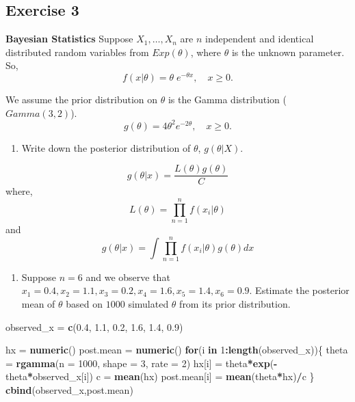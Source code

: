 \documentclass[
]{article}
\newenvironment{Shaded}{\begin{snugshade}}{\end{snugshade}}
\newcommand{\ControlFlowTok}[1]{\textcolor[rgb]{0.13,0.29,0.53}{\textbf{#1}}}
\newcommand{\DataTypeTok}[1]{\textcolor[rgb]{0.13,0.29,0.53}{#1}}
\newcommand{\DecValTok}[1]{\textcolor[rgb]{0.00,0.00,0.81}{#1}}
\newcommand{\FloatTok}[1]{\textcolor[rgb]{0.00,0.00,0.81}{#1}}
\newcommand{\KeywordTok}[1]{\textcolor[rgb]{0.13,0.29,0.53}{\textbf{#1}}}
\newcommand{\NormalTok}[1]{#1}
\newcommand{\OperatorTok}[1]{\textcolor[rgb]{0.81,0.36,0.00}{\textbf{#1}}}
\newcommand{\StringTok}[1]{\textcolor[rgb]{0.31,0.60,0.02}{#1}}
\providecommand{\tightlist}{%
  \setlength{\itemsep}{0pt}\setlength{\parskip}{0pt}}
\begin{document}
\hypertarget{exercise-3}{%
\subsection{Exercise 3}\label{exercise-3}}

\textbf{Bayesian Statistics} Suppose \(X_1,\ldots,X_n\) are \(n\)
independent and identical distributed random variables from
\(Exp(\theta)\), where \(\theta\) is the unknown parameter. So,
\[f(x|\theta) = \theta \; e^{-\theta x}, \quad x \ge 0.\]

We assume the prior distribution on \(\theta\) is the Gamma distribution
(\(Gamma(3,2)\)).
\[ g(\theta) = 4 \theta^2 e^{-2\theta}, \quad x \ge 0. \]

\begin{enumerate}
\def\labelenumi{\arabic{enumi}.}
\tightlist
\item
  Write down the posterior distribution of \(\theta\), \(g(\theta|X)\).
\end{enumerate}

\[g(\theta|x) = {\frac{L(\theta)g(\theta)}{C}}\] where,
\[L(\theta) = {\prod_{n=1}^{n} f(x_i|\theta)}\] and
\[g(\theta|x) = \int{\prod_{n=1}^{n} f(x_i|\theta)g(\theta)}dx\]

\begin{enumerate}
\def\labelenumi{\arabic{enumi}.}
\setcounter{enumi}{1}
\tightlist
\item
  Suppose \(n=6\) and we observe that
  \(x_1=0.4, x_2=1.1, x_3=0.2, x_4=1.6, x_5=1.4, x_6=0.9\). Estimate the
  posterior mean of \(\theta\) based on \(1000\) simulated \(\theta\)
  from its prior distribution.
\end{enumerate}

\begin{Shaded}
\begin{Highlighting}[]
\NormalTok{observed_x =}\StringTok{ }\KeywordTok{c}\NormalTok{(}\FloatTok{0.4}\NormalTok{, }\FloatTok{1.1}\NormalTok{, }\FloatTok{0.2}\NormalTok{, }\FloatTok{1.6}\NormalTok{, }\FloatTok{1.4}\NormalTok{, }\FloatTok{0.9}\NormalTok{)}

\NormalTok{hx =}\StringTok{ }\KeywordTok{numeric}\NormalTok{()}
\NormalTok{post.mean =}\StringTok{ }\KeywordTok{numeric}\NormalTok{()}
\ControlFlowTok{for}\NormalTok{(i }\ControlFlowTok{in} \DecValTok{1}\OperatorTok{:}\KeywordTok{length}\NormalTok{(observed_x))\{}
\NormalTok{theta =}\StringTok{ }\KeywordTok{rgamma}\NormalTok{(}\DataTypeTok{n =} \DecValTok{1000}\NormalTok{, }\DataTypeTok{shape =} \DecValTok{3}\NormalTok{, }\DataTypeTok{rate =} \DecValTok{2}\NormalTok{)}
\NormalTok{hx[i] =}\StringTok{ }\NormalTok{theta}\OperatorTok{*}\KeywordTok{exp}\NormalTok{(}\OperatorTok{-}\NormalTok{theta}\OperatorTok{*}\NormalTok{observed_x[i])}
\NormalTok{c =}\StringTok{ }\KeywordTok{mean}\NormalTok{(hx)}
\NormalTok{post.mean[i] =}\StringTok{ }\KeywordTok{mean}\NormalTok{(theta}\OperatorTok{*}\NormalTok{hx)}\OperatorTok{/}\NormalTok{c}
\NormalTok{\}}
\KeywordTok{cbind}\NormalTok{(observed_x,post.mean)}
\end{Highlighting}
\end{Shaded}
\end{document}
